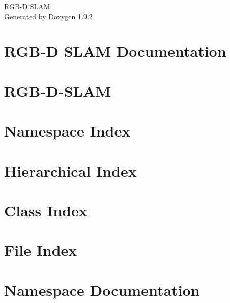 \documentclass[twoside]{book}
\newcommand{\+}{\discretionary{\mbox{\scriptsize$\hookleftarrow$}}{}{}}
\newcommand{\clearemptydoublepage}{%
    \newpage{\pagestyle{empty}\cleardoublepage}%
  }
\begin{document}
  \raggedbottom
    \hypersetup{pageanchor=false,
                bookmarksnumbered=true,
                pdfencoding=unicode
               }
  \begin{titlepage}
  \vspace*{7cm}
  \begin{center}%
  {\Large RGB-\/\+D SLAM}\\
  \vspace*{1cm}
  {\large Generated by Doxygen 1.9.2}\\
  \end{center}
  \end{titlepage}
  \clearemptydoublepage
  \tableofcontents
  \clearemptydoublepage
  \hypersetup{pageanchor=true}
\chapter{RGB-\/D SLAM Documentation}
\label{index}\hypertarget{index}{}
\chapter{RGB-\/\+D-\/\+SLAM}
\label{md__home_baptou__documents_code_robots__r_g_b__s_l_a_m__r_g_b__d__s_l_a_m__r_e_a_d_m_e}

\chapter{Namespace Index}

\chapter{Hierarchical Index}

\chapter{Class Index}

\chapter{File Index}

\chapter{Namespace Documentation}







\end{document}
